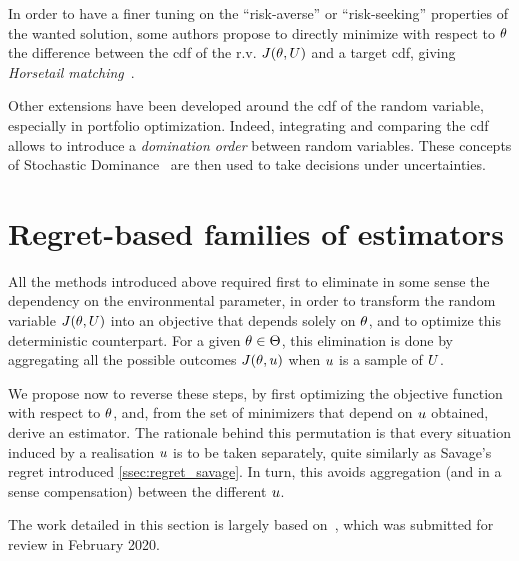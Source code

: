 \documentclass[../../Main_ManuscritThese.tex]{subfiles}
\newcommand\imgpath{/home/victor/acadwriting/Manuscrit/Text/Chapter3/img/}
\begin{document}
In order to have a finer tuning on the ``risk-averse'' or ``risk-seeking'' properties of the wanted solution, some authors propose to directly minimize with respect to $\theta$ the difference between the cdf of the r.v. $J(\theta, U)$ and a target cdf, giving \emph{Horsetail matching}~\cite{cook_extending_2017,cook_effective_2018}.

Other extensions have been developed around the cdf of the random variable, especially in portfolio optimization. Indeed, integrating and comparing the cdf allows to introduce a \emph{domination order} between random variables. These concepts of Stochastic Dominance~\cite{ogryczak_stochastic_1997} are then used to take decisions under uncertainties. 


\section{Regret-based families of estimators}
\label{sec:rr_family}
All the methods introduced above required first to eliminate in some sense the dependency on the environmental parameter, in order to transform the random variable $J(\theta, U)$ into an objective that depends solely on $\theta$, and to optimize this deterministic counterpart.
For a given $\theta\in\Theta$, this elimination is done by aggregating all the possible outcomes $J(\theta, u)$ when $u$ is a sample of $U$.


We propose now to reverse these steps, by first optimizing the objective function with respect to $\theta$, and, from the set of minimizers that depend on $u$ obtained, derive an estimator. The rationale behind this permutation is that every situation induced by a realisation $u$ is to be taken separately, quite similarly as Savage's regret introduced \cref{ssec:regret_savage}.
In turn, this avoids aggregation (and in a sense compensation) between the different $u$.

The work detailed in this section is largely based on~\cite{trappler_robust_2020}, which was submitted for review in February 2020.

%   
\end{document}
